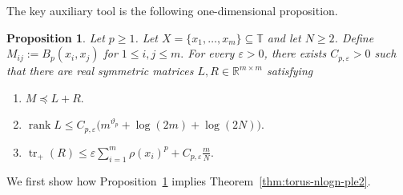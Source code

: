 \documentclass[11pt]{article}
\newtheorem{prop}[theorem]{Proposition}
\theoremstyle{definition}
\newcommand{\T}{\mathbb T}
\newcommand{\R}{\mathbb R}
\begin{document}
The key auxiliary tool is the following one-dimensional proposition.

\begin{prop}\label{prop:one-dim-ple2}
Let \(p\ge1\). Let
\(
X=\{x_1,\dots,x_m\}\subseteq\T
\)
and let \(N\ge2\). Define
\(
M_{ij}:=B_p(x_i,x_j)\) for
\(1\le i,j\le m.
\)
For every \(\varepsilon>0\), there exists \(C_{p,\varepsilon}>0\) such that there
are real symmetric matrices \(L,R\in\R^{m\times m}\) satisfying
\begin{enumerate}
\item[\textup{(1)}]
\(
M\preceq L+R.
\)

\item[\textup{(2)}]
\(
\operatorname{rank}L
\le
C_{p,\varepsilon}\bigl(m^{\vartheta_p}+\log(2m)+\log(2N)\bigr).
\)

\item[\textup{(3)}]
\(
\operatorname{tr}_+(R)
\le
\varepsilon\sum_{i=1}^m \rho(x_i)^p
+
C_{p,\varepsilon}\frac{m}{N}.
\)
\end{enumerate}
\end{prop}

We first show how Proposition~\ref{prop:one-dim-ple2} implies
Theorem~\ref{thm:torus-nlogn-ple2}.
\end{document}
